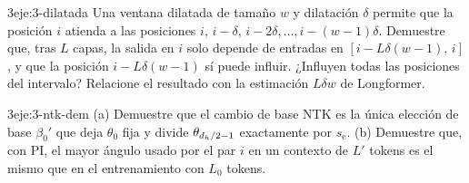 \begin{ejercicio}{3}{eje:3-dilatada}
Una ventana dilatada de tamaño $w$ y dilatación $\delta$ permite que la posición $i$ atienda a las posiciones $i,\,i-\delta,\,i-2\delta,\dots,i-(w-1)\delta$. Demuestre que, tras $L$ capas, la salida en $i$ solo depende de entradas en $[i-L\delta(w-1),\,i]$, y que la posición $i-L\delta(w-1)$ sí puede influir. ¿Influyen todas las posiciones del intervalo? Relacione el resultado con la estimación $L\delta w$ de Longformer.
\end{ejercicio}

\begin{ejercicio}{3}{eje:3-ntk-dem}
(a) Demuestre que el cambio de base NTK es la única elección de base $\beta_0'$ que deja $\theta_0$ fija y divide $\theta_{d_{h}/2-1}$ exactamente por $s_{\mathrm{e}}$. (b) Demuestre que, con PI, el mayor ángulo usado por el par $i$ en un contexto de $L'$ tokens es el mismo que en el entrenamiento con $L_0$ tokens.
\end{ejercicio}
